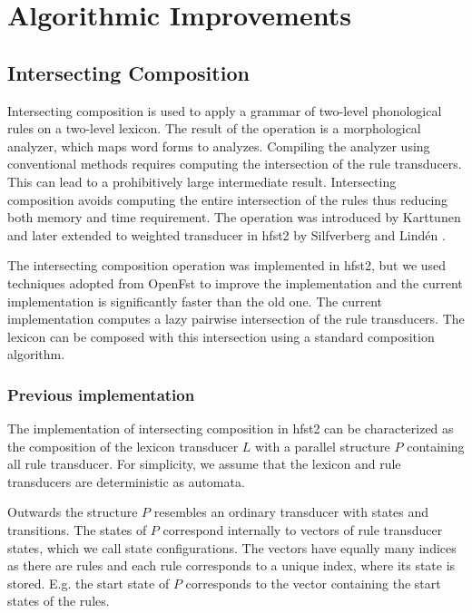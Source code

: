\documentclass{llncs}
\begin{document}
\section{Algorithmic Improvements}
\subsection{Intersecting Composition}

Intersecting composition is used to apply a grammar of two-level
phonological rules on a two-level lexicon. The result of the operation
is a morphological analyzer, which maps word forms to
analyzes. Compiling the analyzer using conventional methods requires
computing the intersection of the rule transducers. This can lead to a
prohibitively large intermediate result. Intersecting composition
avoids computing the entire intersection of the rules thus reducing
both memory and time requirement. The operation was introduced by
Karttunen \cite{Karttunen/1994} and later extended to weighted
transducer in hfst2 by Silfverberg and Lind\'{e}n
\cite{silfverberg/2009/2}.

The intersecting composition operation was implemented in hfst2, but
we used techniques adopted from OpenFst \cite{openfst/2007} to improve
the implementation and the current implementation is significantly
faster than the old one. The current implementation computes a lazy
pairwise intersection of the rule transducers. The lexicon can be
composed with this intersection using a standard composition
algorithm.

\subsubsection{Previous implementation}

The implementation of intersecting composition in hfst2 can be
characterized as the composition of the lexicon transducer $L$ with a
parallel structure $P$ containing all rule transducer. For simplicity,
we assume that the lexicon and rule transducers are deterministic as
automata.

Outwards the structure $P$ resembles an ordinary transducer with
states and transitions. The states of $P$ correspond internally to
vectors of rule transducer states, which we call state
configurations. The vectors have equally many indices as there are rules
and each rule corresponds to a unique index, where its state is
stored. E.g. the start state of $P$ corresponds to the vector
containing the start states of the rules.
\end{document}
